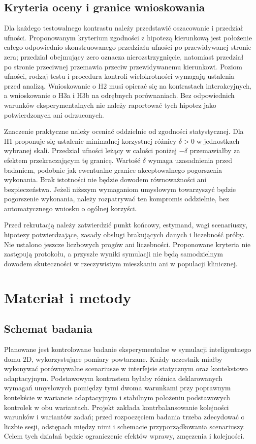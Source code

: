 \documentclass[11pt,a4paper]{article}
\begin{document}
\subsection{Kryteria oceny i granice wnioskowania}

Dla każdego testowalnego kontrastu należy przedstawić oszacowanie i przedział ufności. Proponowanym kryterium zgodności z hipotezą kierunkową jest położenie całego odpowiednio skonstruowanego przedziału ufności po przewidywanej stronie zera; przedział obejmujący zero oznacza nierozstrzygnięcie, natomiast przedział po stronie przeciwnej przemawia przeciw przewidywanemu kierunkowi. Poziom ufności, rodzaj testu i procedura kontroli wielokrotności wymagają ustalenia przed analizą. Wnioskowanie o H2 musi opierać się na kontrastach interakcyjnych, a wnioskowanie o H3a i H3b na odrębnych porównaniach. Bez odpowiednich warunków eksperymentalnych nie należy raportować tych hipotez jako potwierdzonych ani odrzuconych.

Znaczenie praktyczne należy oceniać oddzielnie od zgodności statystycznej. Dla H1 proponuje się ustalenie minimalnej korzystnej różnicy $\delta>0$ w jednostkach wybranej skali. Przedział ufności leżący w całości poniżej $-\delta$ przemawiałby za efektem przekraczającym tę granicę. Wartość $\delta$ wymaga uzasadnienia przed badaniem, podobnie jak ewentualne granice akceptowalnego pogorszenia wykonania. Brak istotności nie będzie dowodem równoważności ani bezpieczeństwa. Jeżeli niższym wymaganiom umysłowym towarzyszyć będzie pogorszenie wykonania, należy rozpatrywać ten kompromis oddzielnie, bez automatycznego wniosku o ogólnej korzyści.

Przed rekrutacją należy zatwierdzić punkt końcowy, estymand, wagi scenariuszy, hipotezy potwierdzające, zasady obsługi brakujących danych i liczebność próby. Nie ustalono jeszcze liczbowych progów ani liczebności. Proponowane kryteria nie zastępują protokołu, a przyszłe wyniki symulacji nie będą samodzielnym dowodem skuteczności w rzeczywistym mieszkaniu ani w populacji klinicznej.

\section{Materiał i metody}

\subsection{Schemat badania}

Planowane jest kontrolowane badanie eksperymentalne w symulacji inteligentnego domu 2D, wykorzystujące pomiary powtarzane. Każdy uczestnik miałby wykonywać porównywalne scenariusze w interfejsie statycznym oraz kontekstowo adaptacyjnym. Podstawowym kontrastem byłaby różnica deklarowanych wymagań umysłowych pomiędzy tymi dwoma warunkami przy poprawnym kontekście w wariancie adaptacyjnym i stabilnym położeniu podstawowych kontrolek w obu wariantach. Projekt zakłada kontrbalansowanie kolejności warunków i wariantów zadań; przed rozpoczęciem badania trzeba zdecydować o liczbie sesji, odstępach między nimi i schemacie przyporządkowania scenariuszy. Celem tych działań będzie ograniczenie efektów wprawy, zmęczenia i kolejności.
\end{document}
